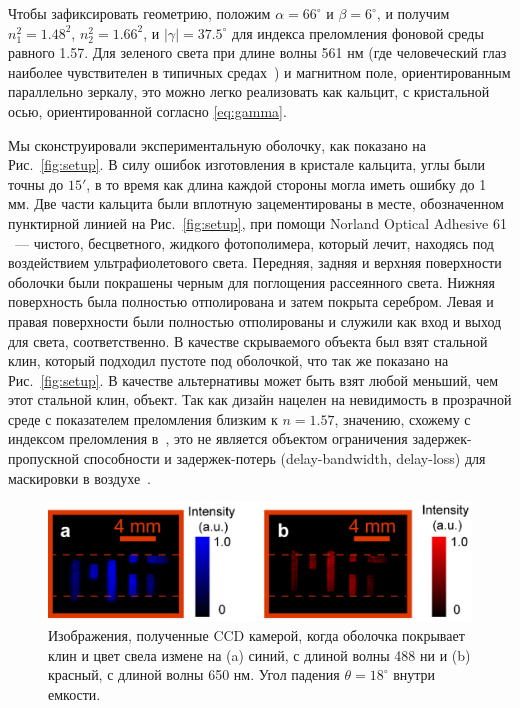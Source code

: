 \documentclass[a4paper, 12pt]{article}
\begin{document}
Чтобы зафиксировать геометрию, положим $\alpha = 66^{\circ}$ и 
$\beta = 6^{\circ}$, и получим $n_1^2=1.48^2$, $n_2^2=1.66^2$, и 
$\left|\gamma\right|=37.5^\circ$ для индекса преломления фоновой среды равного
1.57. Для зеленого света при длине волны 561 нм (где человеческий глаз наиболее
чувствителен в типичных средах~\cite{wyszecki}) и магнитном поле, ориентированным 
параллельно зеркалу, это можно легко реализовать как кальцит, с кристальной
осью, ориентированной согласно \ref{eq:gamma}.

Мы сконструировали экспериментальную оболочку, как показано на 
Рис.~\ref{fig:setup}. В силу ошибок изготовления в кристале кальцита, углы были
точны до $15'$, в то время как длина каждой стороны могла иметь ошибку до 1 мм.
Две части кальцита были вплотную зацементированы в месте, обозначенном 
пунктирной линией на Рис.~\ref{fig:setup}, при помощи 
Norland Optical Adhesive 61 ~--- чистого, бесцветного, жидкого фотополимера,
который лечит, находясь под воздействием ультрафиолетового света.
Передняя, задняя и верхняя поверхности оболочки были покрашены черным для
поглощения рассеянного света. Нижняя поверхность была полностью отполирована
и затем покрыта серебром. Левая и правая поверхности были полностью 
отполированы и служили как вход и выход для света, соответственно. В 
качестве скрываемого объекта был взят стальной клин, который подходил
пустоте под оболочкой, что так же показано на Рис.~\ref{fig:setup}.
В качестве альтернативы может быть взят любой меньший, чем этот стальной клин, 
объект. Так как дизайн нацелен на невидимость в прозрачной среде с показателем
преломления близким к $n=1.57$, значению, схожему с индексом преломления 
в~\cite{valentine},
это не является объектом ограничения задержек-пропускной способности и
задержек-потерь (delay-bandwidth, delay-loss) для маскировки в 
воздухе~\cite{hashemi}.

\begin{figure}
\begin{centering}
\includegraphics[width=0.7\columnwidth,draft=false]{Fig_4}
\caption{\label{fig:bluered} Изображения, полученные CCD камерой, когда 
оболочка покрывает клин и цвет свела измене на (a) синий, с длиной волны 488 
ни и (b) красный, с длиной волны 650 нм. Угол падения $\theta = 18^{\circ}$ 
внутри емкости.}
\end{centering}
\end{figure}
\end{document}
